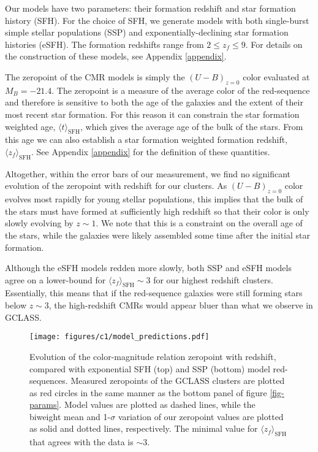 Our models have two parameters: their formation redshift and star formation history (SFH). For the choice of SFH, we generate models with both single-burst simple stellar populations (SSP) and exponentially-declining star formation histories (eSFH). The formation redshifts range from $ 2 \leq z_f \leq 9$. For details on the construction of these models, see Appendix \ref{appendix}.

The zeropoint of the CMR models is simply the $(U-B)_{z=0}$ color evaluated at $M_{B}=-21.4$. The zeropoint is a measure of the average color of the red-sequence and therefore is sensitive to both the age of the galaxies and the extent of their most recent star formation. For this reason it can constrain the star formation weighted age, $\langle t \rangle_\mathrm{SFH}$, which gives the average age of the bulk of the stars. From this age we can also establish a star formation weighted formation redshift, $\langle z_f \rangle_\mathrm{SFH}$. See Appendix \ref{appendix} for the definition of these quantities.

Altogether, within the error bars of our measurement, we find no significant evolution of the zeropoint with redshift for our clusters. As $(U-B)_{z=0}$ color evolves most rapidly for young stellar populations, this implies that the bulk of the stars must have formed at sufficiently high redshift so that their color is only slowly evolving by $z \sim 1$. We note that this is a constraint on the overall age of the stars, while the galaxies were likely assembled some time after the initial star formation.

Although the eSFH models redden more slowly, both SSP and eSFH models agree on a lower-bound for $\langle z_f \rangle_\mathrm{SFH} \sim 3$ for our highest redshift clusters. Essentially, this means that if the red-sequence galaxies were still forming stars below $z \sim 3$, the high-redshift CMRs would appear bluer than what we observe in GCLASS.

\begin{figure}
\texttt{[image: figures/c1/model\_predictions.pdf]}
\caption[Using the color-magnitude relation zeropoint to constrain red-sequence formation redshift]{Evolution of the color-magnitude relation zeropoint with redshift, compared with exponential SFH (top) and SSP (bottom) model red-sequences. Measured zeropoints of the GCLASS clusters are plotted as red circles in the same manner as the bottom panel of figure \ref{fig-params}. Model values are plotted as dashed lines, while the biweight mean and 1-$\sigma$ variation of our zeropoint values are plotted as solid and dotted lines, respectively. The minimal value for $\langle z_f \rangle_\mathrm{SFH}$ that agrees with the data is $\sim 3$.
\label{fig-models}}
\end{figure}


